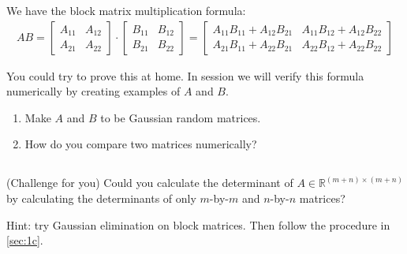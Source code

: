 \documentclass[11pt,letterpaper]{article}
\begin{document}
We have the block matrix multiplication formula:
\begin{align*}
    AB = \left[
\begin{array}{c|c} A_{11} & A_{12} \\\hline A_{21} & A_{22} \end{array} \right]\cdot
\left[
\begin{array}{c|c} B_{11} & B_{12} \\\hline B_{21} & B_{22} \end{array} \right]
= 
\left[
\begin{array}{c|c} A_{11}B_{11}+A_{12}B_{21} & A_{11}B_{12}+A_{12}B_{22} \\\hline A_{21}B_{11}+A_{22}B_{21} & A_{22}B_{12}+A_{22}B_{22} \end{array} \right]
\end{align*}

You could try to prove this at home. In session we will verify this formula numerically by creating examples of $A$ and $B$.

\begin{enumerate}
    \item Make $A$ and $B$ to be Gaussian random matrices.
    \item How do you compare two matrices numerically?
\end{enumerate}

\subsection{}
(Challenge for you) Could you calculate the determinant of $A\in \mathbb{R}^{(m+n)\times(m+n)}$ by calculating the determinants of only $m$-by-$m$ and $n$-by-$n$ matrices? 

Hint: try Gaussian elimination on block matrices. Then follow the procedure in \ref{sec:1c}.


\newpage


\end{document}
